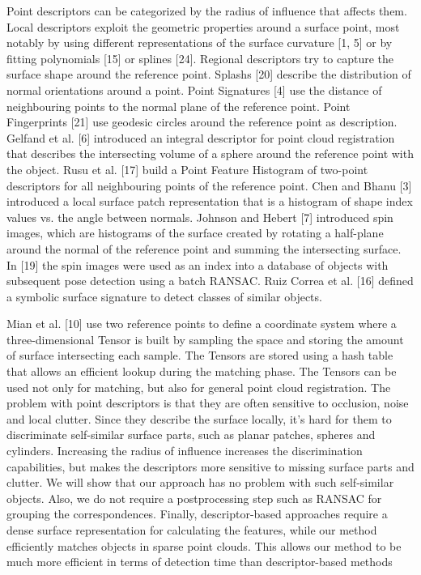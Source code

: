 \documentclass[10]{article}
\begin{document}
Point descriptors can be categorized by the radius of influence that affects them. Local descriptors exploit the geometric properties around a surface point, most notably by using different representations of the surface curvature [1, 5] or by fitting polynomials [15] or splines [24]. Regional descriptors try to capture the surface shape around the reference point. Splashs [20] describe the distribution of normal orientations around a point. Point Signatures [4] use the distance of neighbouring points to the normal plane of the reference point. Point Fingerprints [21] use geodesic circles around the reference point as description. Gelfand et al. [6] introduced an integral descriptor for point cloud registration that describes the intersecting volume of a sphere around the reference point with the object. Rusu et al. [17] build a Point Feature Histogram of two-point descriptors for all neighbouring points of the reference point. Chen and Bhanu [3] introduced a local surface patch representation that is a histogram of shape index values vs. the angle between normals. Johnson and Hebert [7] introduced spin images, which are histograms of the surface created by rotating a half-plane around the normal of the reference point and summing the intersecting surface. In [19] the spin images were used as an index into a database of objects with subsequent pose detection using a batch RANSAC. Ruiz Correa et al. [16] defined a symbolic surface signature to detect classes of similar objects. 

Mian et al. [10] use two reference points to define a coordinate system where a three-dimensional Tensor is built by sampling the space and storing the amount of surface intersecting each sample. The Tensors are stored using a hash table that allows an efficient lookup during the matching phase. The Tensors can be used not only for matching, but also for general point cloud registration. The problem with point descriptors is that they are often sensitive to occlusion, noise and local clutter. Since they describe the surface locally, it’s hard for them to discriminate self-similar surface parts, such as planar patches, spheres and cylinders. Increasing the radius of influence increases the discrimination capabilities, but makes the descriptors more sensitive to missing surface parts and clutter. We will show that our approach has no problem with such self-similar objects. Also, we do not require a postprocessing step such as RANSAC for grouping the correspondences. Finally, descriptor-based approaches require a dense surface representation for calculating the features, while our method efficiently matches objects in sparse point clouds. This allows our method to be much more efficient in terms of detection time than descriptor-based methods
\end{document}
